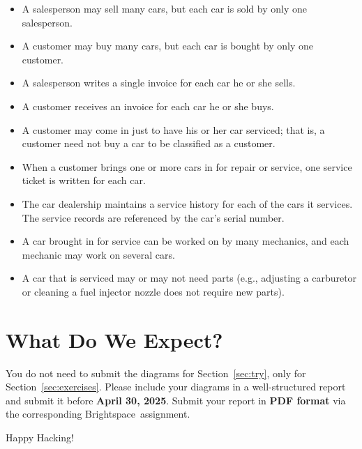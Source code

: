 \documentclass{article}
\begin{document}
\begin{enumerate}
        \begin{itemize}
            \item A salesperson may sell many cars, but each car is sold by only one salesperson.
            \item A customer may buy many cars, but each car is bought by only one customer.
            \item A salesperson writes a single invoice for each car he or she sells.
            \item A customer receives an invoice for each car he or she buys.
            \item A customer may come in just to have his or her car serviced; that is, a customer need not buy a car to be classified as a customer.
            \item When a customer brings one or more cars in for repair or service, one service ticket is written for each car.
            \item The car dealership maintains a service history for each of the cars it services. The service records are referenced by the car’s serial number.
            \item A car brought in for service can be worked on by many mechanics, and each mechanic may work on several cars.
            \item A car that is serviced may or may not need parts (e.g., adjusting a carburetor or cleaning a fuel injector nozzle does not require new parts).
        \end{itemize}
\end{enumerate}

\section{What Do We Expect?}
You do not need to submit the diagrams for Section~\ref{sec:try}, only for Section~\ref{sec:exercises}. Please include your diagrams in a well-structured report and submit it before \textbf{April 30, 2025}. Submit your report in \textbf{PDF format} via the corresponding Brightspace\texttrademark ~assignment.

\vspace{5mm}
Happy Hacking! 
\end{document}

